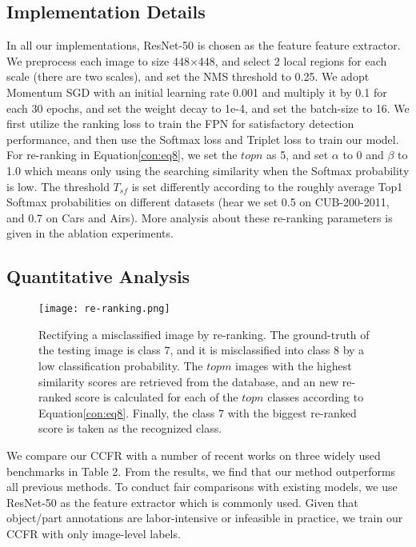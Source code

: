 \documentclass[10pt,twocolumn,letterpaper]{article}
\begin{document}
\subsection{Implementation Details}
In all our implementations, ResNet-50 is chosen as the feature feature extractor. We preprocess each image to size 448$\times$448, and select 2 local regions for each scale (there are two scales), and set the NMS threshold to 0.25. We adopt Momentum SGD with an initial learning rate 0.001 and multiply it by 0.1 for each 30 epochs, and set the weight decay to 1e-4, and set the batch-size to 16. We first utilize the ranking loss\cite{YangLWHGW18} to train the FPN for satisfactory detection performance, and then use the Softmax loss and Triplet loss to train our model. For re-ranking in Equation\ref{con:eq8}, we set the $topn$ as 5, and set $\alpha$ to 0 and $\beta$ to 1.0 which means only using the searching similarity when the Softmax probability is low. The threshold $T_{sf}$ is set differently according to the roughly average Top1 Softmax probabilities on different datasets (hear we set 0.5 on CUB-200-2011, and 0.7 on Cars and Airs). More analysis about these re-ranking parameters is given in the ablation experiments.


\subsection{Quantitative Analysis}
\begin{figure}[t]
\begin{center}
\texttt{[image: re-ranking.png]}
\end{center}
   \caption{Rectifying a misclassified image by re-ranking. The ground-truth of the testing image is class $7$, and it is misclassified into class $8$ by a low classification probability. The $topm$ images with the highest similarity scores are retrieved from the database, and an new re-ranked score is calculated for each of the $topn$ classes according to Equation\ref{con:eq8}. Finally, the class $7$ with the biggest re-ranked score is taken as the recognized class.}
\label{re_ranking}
\end{figure}



We compare our CCFR with a number of recent works on three widely used benchmarks in Table 2. From the results, we find that our method outperforms all previous methods. To conduct fair comparisons with existing models, we use ResNet-50 as the feature extractor which is commonly used. Given that object/part annotations are labor-intensive or infeasible in practice, we train our CCFR with only image-level labels. 
\end{document}
